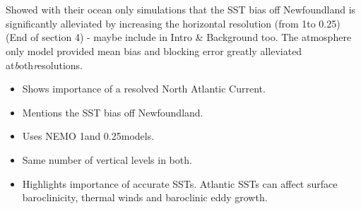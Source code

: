 \documentclass[..\Papers.tex]{subfiles}
\begin{document}
\section{\citep{Scaife2011a}}
Showed with their ocean only simulations that the SST bias off Newfoundland is significantly alleviated by increasing the horizontal resolution (from 1\degree to 0.25\degree) (End of section 4) - maybe include in Intro \& Background too. The atmosphere only model provided mean bias and blocking error greatly alleviated at\textit both\textit resolutions.


\begin{itemize}
    \item Shows importance of a resolved North Atlantic Current.
    \item Mentions the SST bias off Newfoundland.
    \item Uses NEMO 1\degree and 0.25\degree models.
    \item Same number of vertical levels in both.
    \item Highlights importance of accurate SSTs. Atlantic SSTs can affect surface baroclinicity, thermal winds and baroclinic eddy growth.
\end{itemize}
\end{document}
